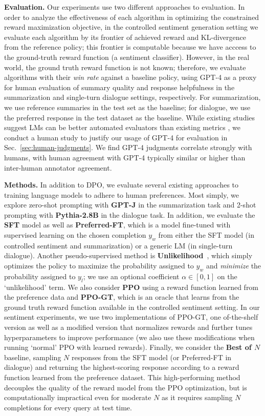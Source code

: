 \documentclass{article}
\begin{document}
\textbf{Evaluation.} Our experiments use two different approaches to evaluation. In order to analyze the effectiveness of each algorithm in optimizing the constrained reward maximization objective, in the controlled sentiment generation setting we evaluate each algorithm by its frontier of achieved reward and KL-divergence from the reference policy; this frontier is computable because we have acccess to the ground-truth reward function (a sentiment classifier). However, in the real world, the ground truth reward function is not known; therefore, we evaluate algorithms with their \textit{win rate} against a baseline policy, using GPT-4 as a proxy for human evaluation of summary quality and response helpfulness in the summarization and single-turn dialogue settings, respectively. For summarization, we use reference summaries in the test set as the baseline; for dialogue, we use the preferred response in the test dataset as the baseline. While existing studies suggest LMs can be better automated evaluators than existing metrics \citep{Chen2023ExploringTU}, we conduct a human study to justify our usage of GPT-4 for evaluation in Sec.~\ref{sec:human-judgments}. We find GPT-4 judgments correlate strongly with humans, with human agreement with GPT-4 typically similar or higher than inter-human annotator agreement. 

\textbf{Methods.} In addition to DPO, we evaluate several existing approaches to training language models to adhere to human preferences. Most simply, we explore zero-shot prompting with \textbf{GPT-J} \citep{gpt-j} in the summarization task and 2-shot prompting with \textbf{Pythia-2.8B} \citep{biderman2023pythia} in the dialogue task. In addition, we evaluate the \textbf{SFT} model as well as \textbf{Preferred-FT}, which is a model fine-tuned with supervised learning on the chosen completion $y_w$ from either the SFT model (in controlled sentiment and summarization) or a generic LM (in single-turn dialogue). Another pseudo-supervised method is \textbf{Unlikelihood}~\citep{welleck2019neural}, which simply optimizes the policy to maximize the probability assigned to $y_w$ and \textit{minimize} the probability assigned to $y_l$; we use an optional coefficient $\alpha\in[0,1]$ on the `unlikelihood' term. We also consider \textbf{PPO} \citep{schulman2017proximal} using a reward function learned from the preference data and \textbf{PPO-GT}, which is an oracle that learns from the ground truth reward function available in the controlled sentiment setting. In our sentiment experiments, we use two implementations of PPO-GT, one of-the-shelf version \cite{leandro_von_werra_2023_7790115} as well as a modified version that normalizes rewards and further tunes hyperparameters to improve performance (we also use these modifications when running `normal' PPO with learned rewards). Finally, we consider the \textbf{Best of $N$} baseline, sampling $N$ responses from the SFT model (or Preferred-FT in dialogue) and returning the highest-scoring response according to a reward function learned from the preference dataset. This high-performing method decouples the quality of the reward model from the PPO optimization, but is computationally impractical even for moderate $N$ as it requires sampling $N$ completions for every query at test time.
\end{document}
